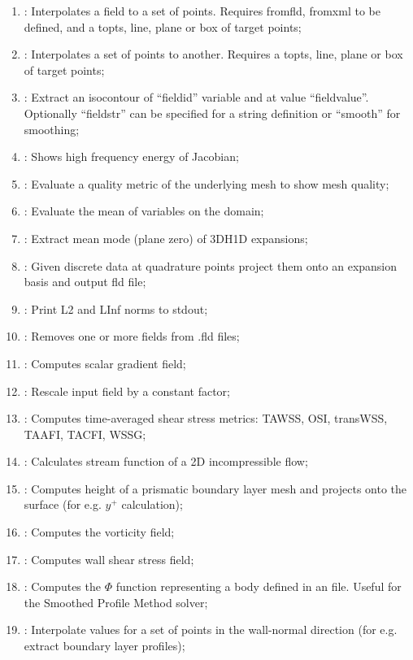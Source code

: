 \begin{enumerate}
\item {}: Interpolates a field to a set of points. Requires fromfld, fromxml to be defined, and a topts, line, plane or box of target points;
\item {}: Interpolates a set of points to another. Requires a topts, line, plane or box of target points;
\item {}: Extract an isocontour of ``fieldid'' variable and at value ``fieldvalue''. Optionally ``fieldstr'' can be specified for a string definition or ``smooth'' for smoothing;
\item {}: Shows high frequency energy of Jacobian;
\item {}: Evaluate a quality metric of the underlying mesh to show mesh quality;
\item {}: Evaluate the mean of variables on the domain;
\item {}: Extract mean mode (plane zero) of 3DH1D expansions;
\item {}: Given discrete data at quadrature points
  project them onto an expansion basis and output fld file;
\item {}: Print L2 and LInf norms to stdout;
\item {}: Removes one or more fields from .fld files;
\item {}: Computes scalar gradient field;
\item {}: Rescale input field by a constant factor;
\item {}: Computes time-averaged shear stress metrics: TAWSS, OSI, transWSS, TAAFI, TACFI, WSSG;
\item {}: Calculates stream function of a 2D incompressible flow;
\item {}: Computes height of a prismatic boundary layer mesh and projects onto the surface (for e.g. $y^+$ calculation);
\item {}: Computes the vorticity field;
\item {}: Computes wall shear stress field;
\item {}: Computes the $\Phi$ function representing a body defined
  in an  file. Useful for the Smoothed Profile Method solver;
\item {}: Interpolate values for a set of points in the wall-normal direction (for e.g. extract boundary layer profiles);

\end{enumerate}
